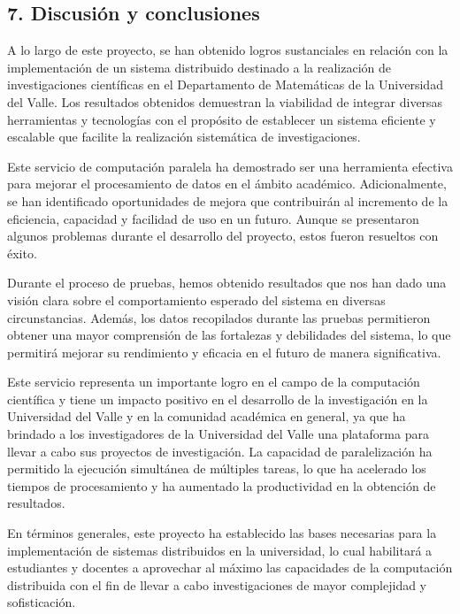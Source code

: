 \begin{spacing}{1.5}
  \begin{tightcenter}
    \section{7. Discusión y conclusiones}
    \mylinespacing
  \end{tightcenter}

  A lo largo de este proyecto, se han obtenido logros sustanciales en relación con la implementación de un sistema distribuido destinado a la realización de investigaciones científicas en el Departamento de Matemáticas de la Universidad del Valle. Los resultados obtenidos demuestran la viabilidad de integrar diversas herramientas y tecnologías con el propósito de establecer un sistema eficiente y escalable que facilite la realización sistemática de investigaciones. 

Este servicio de computación paralela ha demostrado ser una herramienta efectiva para mejorar el procesamiento de datos en el ámbito académico. Adicionalmente, se han identificado oportunidades de mejora que contribuirán al incremento de la eficiencia, capacidad y facilidad de uso en un futuro. Aunque se presentaron algunos problemas durante el desarrollo del proyecto, estos fueron resueltos con éxito.

Durante el proceso de pruebas, hemos obtenido resultados que nos han dado una visión clara sobre el comportamiento esperado del sistema en diversas circunstancias. Además, los datos recopilados durante las pruebas permitieron obtener una mayor comprensión de las fortalezas y debilidades del sistema, lo que permitirá mejorar su rendimiento y eficacia en el futuro de manera significativa.

Este servicio representa un importante logro en el campo de la computación científica y tiene un impacto positivo en el desarrollo de la investigación en la Universidad del Valle y en la comunidad académica en general, ya que ha brindado a los investigadores de la Universidad del Valle una plataforma para llevar a cabo sus proyectos de investigación. La capacidad de paralelización ha permitido la ejecución simultánea de múltiples tareas, lo que ha acelerado los tiempos de procesamiento y ha aumentado la productividad en la obtención de resultados.

En términos generales, este proyecto ha establecido las bases necesarias para la implementación de sistemas distribuidos en la universidad, lo cual habilitará a estudiantes y docentes a aprovechar al máximo las capacidades de la computación distribuida con el fin de llevar a cabo investigaciones de mayor complejidad y sofisticación.


\end{spacing}
